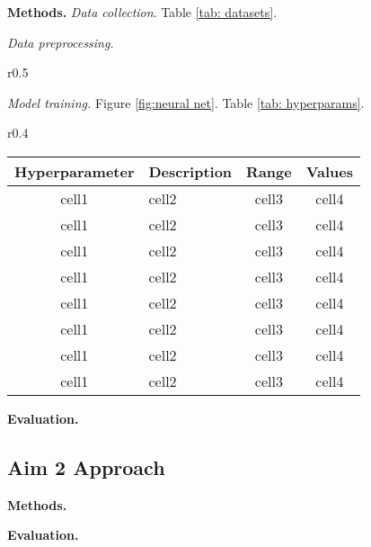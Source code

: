\documentclass[11pt]{article}
\begin{document}
\textbf{Methods.} 
\textit{Data collection}. 
Table \ref{tab: datasets}. \lipsum[99]

\textit{Data preprocessing.}
\lipsum[100-101]

\begin{wrapfigure}{r}{0.5\textwidth}
	\footnotesize
	\centering
	 \caption{Caption}
   	\label{fig:neural net}
   	\vspace{-1em}
\end{wrapfigure}

\textit{Model training.} 
Figure \ref{fig:neural net}. Table \ref{tab: hyperparams}.  
\lipsum[101-102]

\begin{wraptable}{r}{0.4\textwidth}
	\footnotesize
	\centering
	\caption{Caption}
	\label{tab: hyperparams}
	\begin{tabular}{ |c|l|c|c| }
	\hline
	\textbf{Hyperparameter} & \textbf{Description} & \textbf{Range}& \textbf{Values} \\
	\hline
	cell1 & cell2 & cell3 & cell4 \\
	\hline
	cell1 & cell2 & cell3 & cell4 \\
	\hline
	cell1 & cell2 & cell3 & cell4 \\
	\hline
	cell1 & cell2 & cell3 & cell4 \\
	\hline
	cell1 & cell2 & cell3 & cell4 \\
	\hline
	cell1 & cell2 & cell3 & cell4 \\
	\hline
	cell1 & cell2 & cell3 & cell4 \\
	\hline
	cell1 & cell2 & cell3 & cell4 \\
	\hline
	\end{tabular}
\end{wraptable}

\lipsum[104-106] 

\textbf{Evaluation.} 
\lipsum[107-109]


\subsection*{Aim 2 Approach}
\lipsum[60-61]

\textbf{Methods.} 

\lipsum[113-114]

\textbf{Evaluation.} 
\lipsum[115]
\end{document}
